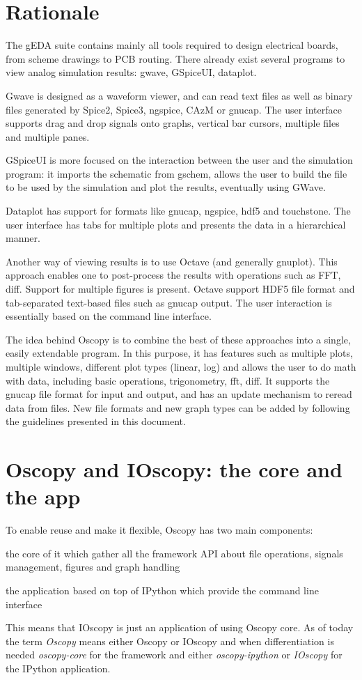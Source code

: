 \documentclass[a4paper,11pt]{report}
\renewenvironment{description}{%
\begin{basedescript}{%
\renewcommand{\makelabel}[1]{\bfseries##1}%
}%
}{%
\end{basedescript}%
}
\begin{document}
\section{Rationale}
The gEDA suite contains mainly all tools required to design electrical boards, from scheme drawings to PCB routing.
There already exist several programs to view analog simulation results: gwave, GSpiceUI, dataplot.

Gwave is designed as a waveform viewer, and can read text files as well as binary files generated by Spice2, Spice3, ngspice, CAzM or gnucap.
The user interface supports drag and drop signals onto graphs, vertical bar cursors, multiple files and multiple panes.

GSpiceUI is more focused on the interaction between the user and the simulation program: it imports the schematic from gschem, allows the user to build the file to be used by the simulation and plot the results, eventually using GWave.

Dataplot has support for formats like gnucap, ngspice, hdf5 and touchstone.
The user interface has tabs for multiple plots and presents the data in a hierarchical manner.

Another way of viewing results is to use Octave (and generally gnuplot).
This approach enables one to post-process the results with operations such as FFT, diff.
Support for multiple figures is present.
Octave support HDF5 file format and tab-separated text-based files such as gnucap output.
The user interaction is essentially based on the command line interface.

The idea behind Oscopy is to combine the best of these approaches into a single, easily extendable program.
In this purpose, it has features such as multiple plots, multiple windows, different plot types (linear, log) and allows the user to do math with data, including basic operations, trigonometry, fft, diff.
It supports the gnucap file format for input and output, and has an update mechanism to reread data from files.
New file formats and new graph types can be added by following the guidelines presented in this document.

\section{Oscopy and IOscopy: the core and the app}
To enable reuse and make it flexible, Oscopy has two main components:
\begin{description}
\item[Oscopy] the core of it which gather all the framework API about file operations, signals management, figures and graph handling
\item[IOscopy] the application based on top of IPython which provide the command line interface
\end{description}
This means that IOscopy is just an application of using Oscopy core.
As of today the term \textsl{Oscopy} means either Oscopy or IOscopy and when differentiation is needed \textsl{oscopy-core} for the framework and either \textsl{oscopy-ipython} or \textsl{IOscopy} for the IPython application.
\end{document}
